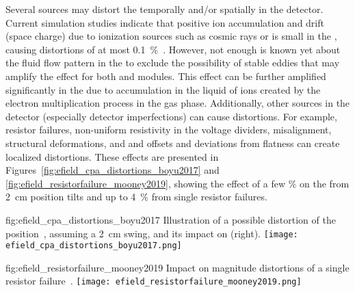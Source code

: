 Several sources may distort the \efield temporally  and/or spatially in the detector. Current simulation studies indicate that positive ion accumulation and drift (space charge) due to ionization sources such as cosmic rays or  is small in the  , causing \efield distortions of at most \SI{0.1}{\%}~\cite{bib:mooney2018}.
However, not enough is known yet about the fluid flow pattern in the  to exclude the possibility of stable eddies that may amplify the effect for both \single and \dual modules. %
This effect can be further amplified significantly in the  due to accumulation in the liquid of ions created by the electron multiplication process in the gas phase.
Additionally, other sources in the detector (especially detector imperfections) can cause \efield distortions. For example,  resistor failures, non-uniform resistivity in the voltage dividers,  misalignment,  structural deformations, and  and  offsets and  deviations from flatness can create localized \efield distortions. These effects are presented in Figures~\ref{fig:efield_cpa_distortions_boyu2017} and \ref{fig:efield_resistorfailure_mooney2019}, showing the effect of a few \% on the \efield from \SI{2}{\cm}  position tilts and %
up to \SI{4}{\%} from  single resistor failures.

\begin{dunefigure}{fig:efield_cpa_distortions_boyu2017}
{Illustration of a possible distortion of the  position~\cite{bib:yu2017a}, assuming a \SI{2}{\cm} swing, and its impact on \efield (right).}
\texttt{[image: efield\_cpa\_distortions\_boyu2017.png]}
\end{dunefigure}

\begin{dunefigure}{fig:efield_resistorfailure_mooney2019}
{Impact on \efield magnitude distortions of a single  resistor failure~\cite{bib:mooney2019a}.}
\texttt{[image: efield\_resistorfailure\_mooney2019.png]}
\end{dunefigure}

